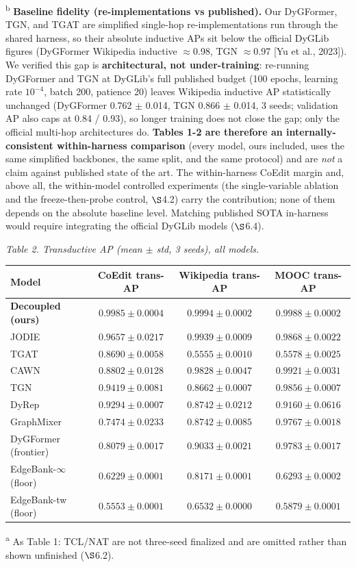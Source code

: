 \documentclass[conference]{IEEEtran}
\newcommand{\floatcap}[1]{{\footnotesize\itshape #1\par}}
\begin{document}
\textsuperscript{b} \textbf{Baseline fidelity (re-implementations vs published).} Our DyGFormer, TGN, and TGAT are simplified single-hop re-implementations run through the shared harness, so their absolute inductive APs sit below the official DyGLib figures (DyGFormer Wikipedia inductive $\approx$0.98, TGN $\approx$0.97 [Yu et al., 2023]). We verified this gap is \textbf{architectural, not under-training}: re-running DyGFormer and TGN at DyGLib's full published budget (100 epochs, learning rate \(10^{-4}\), batch 200, patience 20) leaves Wikipedia inductive AP statistically unchanged (DyGFormer 0.762 $\pm$ 0.014, TGN 0.866 $\pm$ 0.014, 3 seeds; validation AP also caps at 0.84 / 0.93), so longer training does not close the gap; only the official multi-hop architectures do. \textbf{Tables 1-2 are therefore an internally-consistent within-harness comparison} (every model, ours included, uses the same simplified backbones, the same split, and the same protocol) and are \emph{not} a claim against published state of the art. The within-harness CoEdit margin and, above all, the within-model controlled experiments (the single-variable ablation and the freeze-then-probe control, $\S$4.2) carry the contribution; none of them depends on the absolute baseline level. Matching published SOTA in-harness would require integrating the official DyGLib models ($\S$6.4).

\begin{table}[t]
\centering
\floatcap{Table 2. Transductive AP (mean $\pm$ std, 3 seeds), all models.}
\footnotesize
\begin{tabular}{@{}lccc@{}}
\toprule
Model & CoEdit trans-AP & Wikipedia trans-AP & MOOC trans-AP \\
\midrule
\textbf{Decoupled (ours)} & $\mathbf{0.9985 \pm 0.0004}$ & $\mathbf{0.9994 \pm 0.0002}$ & $\mathbf{0.9988 \pm 0.0002}$ \\
JODIE & $0.9657 \pm 0.0217$ & $0.9939 \pm 0.0009$ & $0.9868 \pm 0.0022$ \\
TGAT & $0.8690 \pm 0.0058$ & $0.5555 \pm 0.0010$ & $0.5578 \pm 0.0025$ \\
CAWN & $0.8802 \pm 0.0128$ & $0.9828 \pm 0.0047$ & $0.9921 \pm 0.0031$ \\
TGN & $0.9419 \pm 0.0081$ & $0.8662 \pm 0.0007$ & $0.9856 \pm 0.0007$ \\
DyRep & $0.9294 \pm 0.0007$ & $0.8742 \pm 0.0212$ & $0.9160 \pm 0.0616$ \\
GraphMixer & $0.7474 \pm 0.0233$ & $0.8742 \pm 0.0085$ & $0.9767 \pm 0.0018$ \\
DyGFormer (frontier) & $0.8079 \pm 0.0017$ & $0.9033 \pm 0.0021$ & $0.9783 \pm 0.0017$ \\
EdgeBank-$\infty$ (floor) & $0.6229 \pm 0.0001$ & $0.8171 \pm 0.0001$ & $0.6293 \pm 0.0002$ \\
EdgeBank-tw (floor) & $0.5553 \pm 0.0001$ & $0.6532 \pm 0.0000$ & $0.5879 \pm 0.0001$ \\
\bottomrule
\end{tabular}
\par{\footnotesize \textsuperscript{a} As Table 1: TCL/NAT are not three-seed finalized and are omitted rather than shown unfinished ($\S$6.2).}
\end{table}
\end{document}
